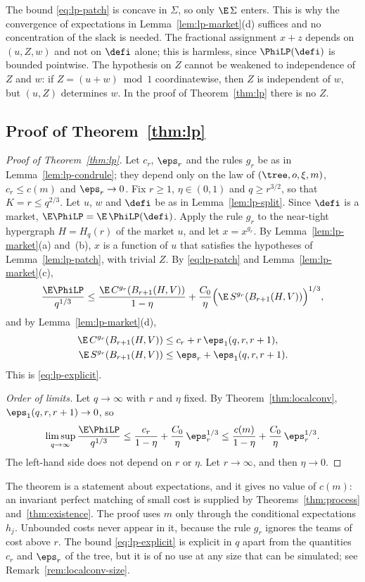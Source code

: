 The bound \eqref{eq:lp-patch} is concave in $\Sigma$, so only $\E\,\Sigma$ enters. This is
why the convergence of expectations in Lemma~\ref{lem:lp-market}(d) suffices and no
concentration of the slack is needed. The fractional assignment $x+z$ depends on $(u,Z,w)$
and not on $\defi$ alone; this is harmless, since $\PhiLP(\defi)$ is bounded pointwise. The
hypothesis on $Z$ cannot be weakened to independence of $Z$ and $w$: if $Z=(u+w)\bmod1$
coordinatewise, then $Z$ is independent of $w$, but $(u,Z)$ determines $w$. In the proof of
Theorem~\ref{thm:lp} there is no $Z$.

\subsection{Proof of Theorem~\ref{thm:lp}}\label{sec:lp-proof}

\begin{proof}[Proof of Theorem~\ref{thm:lp}]
Let $c_r$, $\eps_r$ and the rules $g_r$ be as in Lemma~\ref{lem:lp-condrule}; they depend
only on the law of $(\tree,o,\xi,m)$, $c_r\le c(m)$ and $\eps_r\to0$. Fix $r\ge1$,
$\eta\in(0,1)$ and $q\ge r^{3/2}$, so that $K=r\le q^{2/3}$. Let $u$, $w$ and $\defi$ be as
in Lemma~\ref{lem:lp-split}. Since $\defi$ is a market, $\E\PhiLP=\E\,\PhiLP(\defi)$. Apply
the rule $g_r$ to the near-tight hypergraph $H=H_q(r)$ of the market $u$, and let
$x=x^{g_r}$. By Lemma~\ref{lem:lp-market}(a) and~(b), $x$ is a function of $u$ that
satisfies the hypotheses of Lemma~\ref{lem:lp-patch}, with trivial $Z$. By
\eqref{eq:lp-patch} and Lemma~\ref{lem:lp-market}(c),
\[
\frac{\E\PhiLP}{q^{1/3}}\le\frac{\E\,C^{g_r}(B_{r+1}(H,V))}{1-\eta}
+\frac{C_0}{\eta}\Bigl(\E\,S^{g_r}(B_{r+1}(H,V))\Bigr)^{1/3},
\]
and by Lemma~\ref{lem:lp-market}(d),
\begin{align*}
\E\,C^{g_r}(B_{r+1}(H,V))&\le c_r+r\,\eps_1(q,r,r+1),\\
\E\,S^{g_r}(B_{r+1}(H,V))&\le\eps_r+\eps_1(q,r,r+1).
\end{align*}
This is \eqref{eq:lp-explicit}.

\emph{Order of limits.} Let $q\to\infty$ with $r$ and $\eta$ fixed. By
Theorem~\ref{thm:localconv}, $\eps_1(q,r,r+1)\to0$, so
\[
\limsup_{q\to\infty}\frac{\E\PhiLP}{q^{1/3}}\le\frac{c_r}{1-\eta}+\frac{C_0}{\eta}\,
\eps_r^{1/3}\le\frac{c(m)}{1-\eta}+\frac{C_0}{\eta}\,\eps_r^{1/3}.
\]
The left-hand side does not depend on $r$ or $\eta$. Let $r\to\infty$, and then
$\eta\to0$.
\end{proof}

\begin{remark}\label{rem:lp-scope}
The theorem is a statement about expectations, and it gives no value of $c(m)$: an invariant
perfect matching of small cost is supplied by Theorems~\ref{thm:process}
and~\ref{thm:existence}. The proof uses $m$ only through the conditional expectations
$h_j$. Unbounded costs never appear in it, because the rule $g_r$ ignores the teams of cost
above $r$. The bound \eqref{eq:lp-explicit} is explicit in $q$ apart from the quantities
$c_r$ and $\eps_r$ of the tree, but it is of no use at any size that can be simulated; see
Remark~\ref{rem:localconv-size}.
\end{remark}

